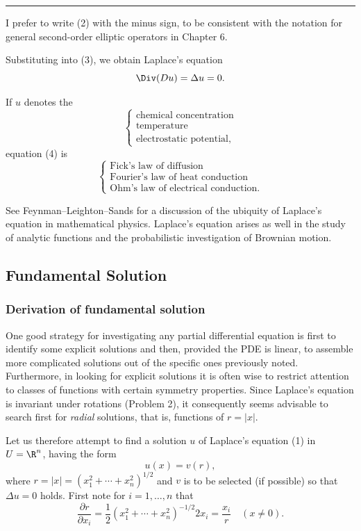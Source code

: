 \begin{center}
\rule{2in}{0.4pt}
\end{center}
{\small *I prefer to write (2) with the minus sign, to be consistent with the notation for general second-order elliptic operators in Chapter 6.}

Substituting into (3), we obtain Laplace's equation
$$\Div(Du) = \Delta u = 0.$$

If $u$ denotes the
$$\begin{cases}
\text{chemical concentration} \\
\text{temperature} \\
\text{electrostatic potential,}
\end{cases}$$
equation (4) is
$$\begin{cases}
\text{Fick's law of diffusion} \\
\text{Fourier's law of heat conduction} \\
\text{Ohm's law of electrical conduction.}
\end{cases}$$

See Feynman--Leighton--Sands \cite{FeynmanLeightonSands1966} for a discussion of the ubiquity of Laplace's equation in mathematical physics. Laplace's equation arises as well in the study of analytic functions and the probabilistic investigation of Brownian motion.

\subsection{Fundamental Solution}
\label{sec:laplace-fundamental-solution}

\subsubsection{Derivation of fundamental solution}
\label{sec:laplace-fundamental-solution-derivation}

One good strategy for investigating any partial differential equation is first to identify some explicit solutions and then, provided the PDE is linear, to assemble more complicated solutions out of the specific ones previously noted. Furthermore, in looking for explicit solutions it is often wise to restrict attention to classes of functions with certain symmetry properties. Since Laplace's equation is invariant under rotations (Problem 2), it consequently seems advisable to search first for \textit{radial} solutions, that is, functions of $r = |x|$.

Let us therefore attempt to find a solution $u$ of Laplace's equation (1) in $U = \R^n$, having the form
$$u(x) = v(r),$$
where $r = |x| = (x_1^2 + \cdots + x_n^2)^{1/2}$ and $v$ is to be selected (if possible) so that $\Delta u = 0$ holds. First note for $i = 1, \ldots, n$ that
$$\frac{\partial r}{\partial x_i} = \frac{1}{2}(x_1^2 + \cdots + x_n^2)^{-1/2} 2x_i = \frac{x_i}{r} \quad (x \neq 0).$$

